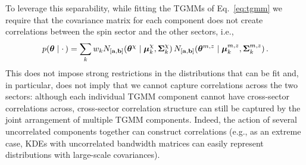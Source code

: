 \documentclass[twocolumn,usenames,dvipsnames,linenumbers]{aastex631}
\begin{document}
To leverage this separability, while fitting the \acp{TGMM} of Eq.~\eqref{eq:tgmm} 
we require that the covariance matrix for each component does not create correlations between the spin sector and the other sectors, i.e.,
\begin{equation}
	p(\boldsymbol{\theta} \mid \cdot\, ) = \sum_k w_k N_{[{\bf a},{\bf b}]}(\boldsymbol{\theta}^\chi \mid \boldsymbol{\mu}^{\chi}_k, {\bf \Sigma}^{\chi}_k)\, N_{[{\bf a},{\bf b}]}(\boldsymbol{\theta}^{m,z} \mid \boldsymbol{\mu}^{m,z}_k, {\bf \Sigma}^{m,z}_k) \,.
	\label{eq:seperatedtgmmfit}
\end{equation}
This does not impose strong restrictions in the distributions that can be fit and, in particular, does not imply that we cannot capture correlations across the two sectors: although each individual \ac{TGMM} component cannot have cross-sector correlations across, cross-sector correlation structure can still be captured by the joint arrangement of multiple \ac{TGMM} components. 
Indeed, the action of several uncorrelated components together can construct correlations (e.g., as an extreme case, \acp{KDE} with uncorrelated bandwidth matrices can easily represent distributions with large-scale covariances).
\end{document}
